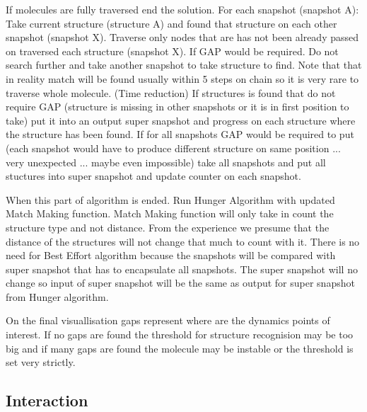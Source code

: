 \documentclass[twocolumn]{bmcart}%
\begin{document}
If molecules are fully traversed end the solution.
For each snapshot (snapshot A):
Take current structure (structure A) and found that structure on each other snapshot (snapshot X). Traverse only nodes that are has not been already passed on traversed each structure (snapshot X). 
If GAP would be required. Do not search further and take another snapshot to take structure to find. Note that that in reality match will be found usually within 5 steps on chain so it is very rare to traverse whole molecule. (Time reduction)
If structures is found that do not require GAP (structure is missing in other snapshots or it is in first position to take) put it into an output super snapshot and progress on each structure where the structure has been found.
If for all snapshots GAP would be required to put (each snapshot would have to produce different structure on same position ... very unexpected ... maybe even impossible) take all snapshots and put all stuctures into super snapshot and update counter on each snapshot.

When this part of algorithm is ended. Run Hunger Algorithm with updated Match Making function. Match Making function will only take in count the structure type and not distance. From the experience we presume that the distance of the structures will not change that much to count with it. There is no need for Best Effort algorithm because the snapshots will be compared with super snapshot that has to encapsulate all snapshots. The super snapshot will no change so input of super snapshot will be the same as output for super snapshot from Hunger algorithm. 

On the final visuallisation gaps represent where are the dynamics points of interest. If no gaps are found the threshold for structure recognision may be too big and if many gaps are found the molecule may be instable or the threshold is set very strictly.
 

\subsection*{Interaction}

\end{document}
